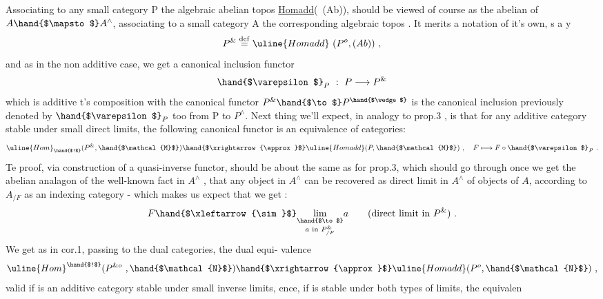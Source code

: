 
Associating to any small category P the algebraic abelian topos
\uline{Homadd}(~(Ab)), should be viewed of course as the abelian  of
$A \hand{$\mapsto$} A^{\wedge}$, associating to a small category A the corresponding algebraic
topos . It merits a notation of it's own, s a y
\[ P^{\&} \overset{\mathrm{def}}{=} \uline{Homadd}\ (P^{o}, (Ab)) \ , \]
and as  in the non additive case, we get a canonical inclusion functor
\[ \hand{$\varepsilon$}_{P} \ : \ P \longrightarrow P^{\&} \]
which is additive \hand{(}t's composition with the canonical functor $P^{\&}\hand{$\to$} P^{\hand{$\wedge$}}$ is
 the canonical inclusion previously denoted by $\hand{$\varepsilon$}_{P}$ too from P to $P^{\wedge}$.\hand{)}
Next thing we'll expect, in analogy to prop.3 , is that  for any
additive category  stable under small direct limits, the following
canonical functor is an equivalence of categories:
\margin{(**)}
\[ \uline{Hom}_{\hand{$!$}}(P^{\&}, \hand{$\mathcal{M}$}) \hand{$\xrightarrow{\approx}$} \uline{Homadd}(P, \hand{$\mathcal{M}$}) \ , \quad F \longmapsto F \circ \hand{$\varepsilon$}_{P} \ . \]
Te proof, via construction of a quasi-inverse functor, should be about
the same as for prop.3, which should go through once we get the abelian
analagon of the well-known fact in $A^{\wedge}$ , that any object in $A^{\wedge}$ can be
recovered as direct limit in $A^{\wedge}$ of objects of $A$, according to $A_{/F}$ as
an indexing category - which makes us expect that we get  :
\[ F \hand{$\xleftarrow{\sim}$} \underset{a \text{ in } P^{\&}_{/F}}{\lim_{\hand{$\to$}}} a \qquad (\text{direct limit in } P^{\&}) \ . \]
We  get as in cor.1, passing to the dual categories, the dual equi-%
valence
\[ \uline{Hom}^{\hand{$!$}}(P^{\& o} \ , \hand{$\mathcal{N}$}) \hand{$\xrightarrow{\approx}$} \uline{Homadd}(P^{o}, \hand{$\mathcal{N}$}) \ , \]
valid if  is an additive category stable under small inverse limits,
 ence, if  is  stable under both types of limits, the equivalen
